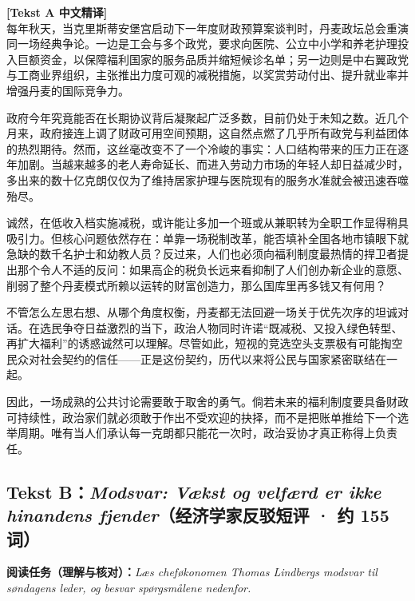 \begin{transbox}
\small
\textbf{\color{NCDTeal}[Tekst A 中文精译]}\\
每年秋天，当克里斯蒂安堡宫启动下一年度财政预算案谈判时，丹麦政坛总会重演同一场经典争论。一边是工会与多个政党，要求向医院、公立中小学和养老护理投入巨额资金，以保障福利国家的服务品质并缩短候诊名单；另一边则是中右翼政党与工商业界组织，主张推出力度可观的减税措施，以奖赏劳动付出、提升就业率并增强丹麦的国际竞争力。

政府今年究竟能否在长期协议背后凝聚起广泛多数，目前仍处于未知之数。近几个月来，政府接连上调了财政可用空间预期，这自然点燃了几乎所有政党与利益团体的热烈期待。然而，这丝毫改变不了一个冷峻的事实：人口结构带来的压力正在逐年加剧。当越来越多的老人寿命延长、而进入劳动力市场的年轻人却日益减少时，多出来的数十亿克朗仅仅为了维持居家护理与医院现有的服务水准就会被迅速吞噬殆尽。

诚然，在低收入档实施减税，或许能让多加一个班或从兼职转为全职工作显得稍具吸引力。但核心问题依然存在：单靠一场税制改革，能否填补全国各地市镇眼下就急缺的数千名护士和幼教人员？反过来，人们也必须向福利制度最热情的捍卫者提出那个令人不适的反问：如果高企的税负长远来看抑制了人们创办新企业的意愿、削弱了整个丹麦模式所赖以运转的财富创造力，那么国库里再多钱又有何用？

不管怎么左思右想、从哪个角度权衡，丹麦都无法回避一场关于优先次序的坦诚对话。在选民争夺日益激烈的当下，政治人物同时许诺“既减税、又投入绿色转型、再扩大福利”的诱惑诚然可以理解。尽管如此，短视的竞选空头支票极有可能掏空民众对社会契约的信任——正是这份契约，历代以来将公民与国家紧密联结在一起。

因此，一场成熟的公共讨论需要敢于取舍的勇气。倘若未来的福利制度要具备财政可持续性，政治家们就必须敢于作出不受欢迎的抉择，而不是把账单推给下一个选举周期。唯有当人们承认每一克朗都只能花一次时，政治妥协才真正称得上负责任。
\end{transbox}

\subsection*{Tekst B：\textit{Modsvar: Vækst og velfærd er ikke hinandens fjender}（经济学家反驳短评 · 约 155 词）}

\textbf{阅读任务（理解与核对）：}\textit{Læs cheføkonomen Thomas Lindbergs modsvar til søndagens leder, og besvar spørgsmålene nedenfor.}

